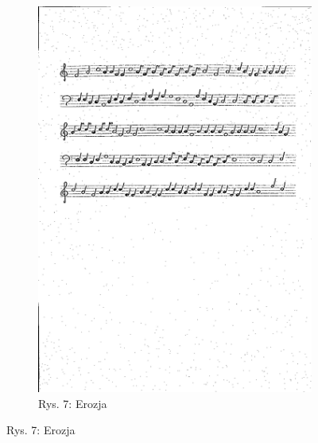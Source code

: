 \documentclass[11pt]{article}
\begin{document}
\begin{figure}[H]
\begin{subfigure}{.5\textwidth}
        \includegraphics[width=\linewidth]{staffs4_erode.png}
        \caption{Rys. 7: Erozja}
        \label{fig:sub2}
    \end{subfigure}
    \label{fig:test}
\end{figure}
\end{document}
